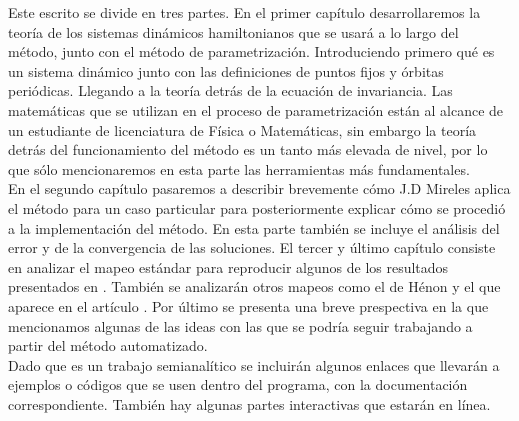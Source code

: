 Este escrito se divide en tres partes. En el primer capítulo desarrollaremos la teoría de los sistemas dinámicos hamiltonianos que se usará a lo largo del método, junto con el método de parametrización. Introduciendo primero qué es un sistema dinámico junto con las definiciones de puntos fijos y órbitas periódicas. Llegando a la teoría detrás de la ecuación de invariancia. Las matemáticas que se utilizan en el proceso de parametrización están al alcance de un estudiante de licenciatura de Física o Matemáticas, sin embargo la teoría detrás del funcionamiento del método es un tanto más elevada de nivel, por lo que sólo mencionaremos en esta parte las herramientas más fundamentales.  \\


En el segundo capítulo pasaremos a describir brevemente cómo J.D Mireles aplica el método para un caso particular para posteriormente explicar cómo se procedió a la implementación del método. En esta parte también se incluye el análisis del error y de la convergencia de las soluciones. El tercer y último capítulo consiste en analizar el mapeo estándar para reproducir algunos de los resultados presentados en \cite{Mireles}. También se analizarán otros mapeos como el de Hénon y el que aparece en el artículo \cite{Jung}. Por último se presenta una breve prespectiva en la que mencionamos algunas de las ideas con las que se podría seguir trabajando a partir del método automatizado. \\

Dado que es un trabajo semianalítico se incluirán algunos enlaces que llevarán a ejemplos o códigos que se usen dentro del programa, con la documentación correspondiente. También hay algunas partes interactivas que estarán en línea. 

